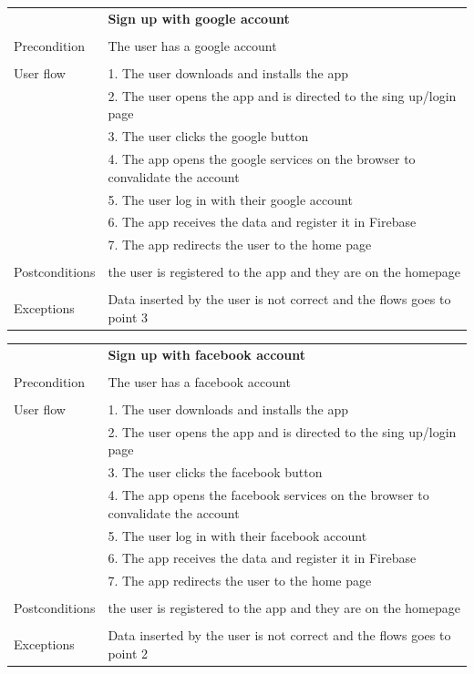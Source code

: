 \documentclass[10pt]{article}
\begin{document}
    \begin{tabular}{ p{3cm}|p{8cm} }
     &\textbf{Sign up with google account} \\
     \\
     Precondition & The user has a google account \\
     \\
     User flow 
     & 1. The user downloads and installs the app\\ 
     & 2. The user opens the app and is directed to the sing up/login page \\
     & 3. The user clicks the google button\\ 
     & 4. The app opens the google services on the browser to convalidate the account  \\
     & 5. The user log in with their google account\\
     & 6. The app receives the data and register it in Firebase\\
     & 7. The app redirects the user to the home page\\
     \\
     Postconditions & the user is registered to the app and they are on the homepage \\ 
     \\
     Exceptions & Data inserted by the user is not correct and the flows goes to point 3\\
    \end{tabular}
    \newline
    \newline
    \newline
    \begin{tabular}{ p{3cm}|p{8cm} }
     & \textbf{Sign up with facebook account} \\
     \\
     Precondition & The user has a facebook account \\
     \\
     User flow  
     & 1. The user downloads and installs the app\\ 
     & 2. The user opens the app and is directed to the sing up/login page \\
     & 3. The user clicks the facebook button\\ 
     & 4. The app opens the facebook services on the browser to convalidate the account  \\
     & 5. The user log in with their facebook account\\
     & 6. The app receives the data and register it in Firebase\\
     & 7. The app redirects the user to the home page\\
     \\
     Postconditions & the user is registered to the app and they are on the homepage \\ 
     \\
     Exceptions & Data inserted by the user is not correct and the flows goes to point 2\\
    \end{tabular}
\end{document}
